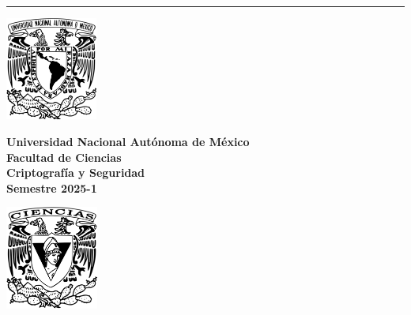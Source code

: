 
\begin{titlepage}
    \begin{center}
        \rule{17cm}{0.1mm}
    \end{center}
    \begin{center}
        \begin{minipage}{3cm}
            \begin{center}
                \includegraphics[height=3.4cm]{Logo_UNAM.png}
            \end{center}
        \end{minipage}\hfill
        \begin{minipage}{10cm}
    
            \begin{center}
                \large
                \textbf{ Universidad Nacional Autónoma de México}\\[0.1cm]
                \textbf{Facultad de Ciencias}\\[0.1cm]
                \textbf{Criptografía y Seguridad}\\[0.1cm]
                \textbf{Semestre 2025-1}\\[0.1cm]
            \end{center}
        \end{minipage}\hfill
        \begin{minipage}{3cm}
            \begin{center}
                \includegraphics[height=3.4cm]{Logo_FC.png}
            \end{center}
        \end{minipage}
    \end{center}


\end{titlepage}
